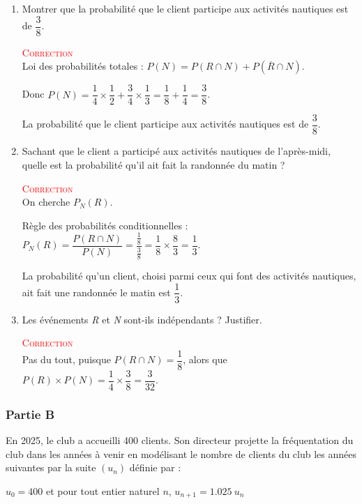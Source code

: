 \documentclass[10pt]{article}
\providecommand{\np}[2][]{{#2~#1}}
\begin{document}
\begin{enumerate}
		\item Montrer que la probabilité que le client participe aux activités nautiques est de \mbox{$\dfrac38$}.

				\textcolor{red}{\textsc{Correction}}\\
				Loi des probabilités totales : \mbox{$P(N)=P(R\cap N)+P(\overline{R}\cap N)$}.

				Donc \mbox{$P(N)=\dfrac14\times\dfrac12+\dfrac34\times\dfrac13=\dfrac18+\dfrac14=\dfrac38$}.

				La  probabilité que le client participe aux activités nautiques est de \mbox{$\dfrac38$}.

\item Sachant que le client a participé aux activités nautiques de l'après-midi, quelle est la probabilité qu'il ait fait la randonnée du matin ?

				\textcolor{red}{\textsc{Correction}}\\

				On cherche \mbox{$P_N (R)$}.

				Règle des probabilités conditionnelles : \mbox{$P_N (R)=\dfrac{P(R \cap N)}{P(N)}=\dfrac{\frac18}{\frac38}=\dfrac18\times\dfrac83=\dfrac13$}.

				La probabilité qu'un client, choisi parmi ceux qui font des activités nautiques, ait fait une randonnée le matin est $\dfrac13$.
		\item Les événements \textit{R} et \textit{N} sont-ils indépendants ? Justifier.

						\textcolor{red}{\textsc{Correction}}\\
						Pas du tout, puisque \mbox{$P(R \cap N)=\dfrac18$}, alors que \mbox{$P(R)\times P(N)=\dfrac14\times\dfrac38=\dfrac{3}{32}$}.
	\end{enumerate}
\subsubsection*{Partie B}
En 2025, le club a accueilli 400 clients. Son directeur projette la fréquentation du club dans les années à venir en modélisant le nombre de clients du club les années suivantes par la suite \mbox{$(u_n)$} définie par :

\begin{center}
	\mbox{$u_0=400$} et pour tout entier naturel $n$, \mbox{$u_{n+1}=\np{1.025}u_n$}
\end{center}
\end{document}
